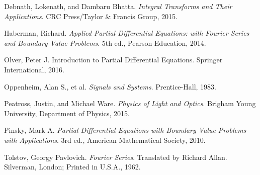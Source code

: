 \documentclass[12pt,letterpaper]{article}
\begin{document}

\begin{thebibliography}{9}

Debnath, Lokenath, and Dambaru Bhatta. \textit{Integral Transforms and Their Applications}. CRC Press/Taylor \& Francis Group, 2015.

Haberman, Richard. \textit{Applied Partial Differential Equations: with Fourier Series and Boundary Value Problems}. 5th ed., Pearson Education, 2014.

Olver, Peter J. Introduction to Partial Differential Equations. Springer International, 2016.

Oppenheim, Alan S., et al. \textit{Signals and Systems}. Prentice-Hall, 1983.

Peatross, Justin, and Michael Ware. \textit{Physics of Light and Optics}. Brigham Young University, Department of Physics, 2015.

Pinsky, Mark A. \textit{Partial Differential Equations with Boundary-Value Problems with Applications}. 3rd ed., American Mathematical Society, 2010.

Tolstov, Georgy Pavlovich. \textit{Fourier Series}. Translated by Richard Allan. Silverman, London; Printed in U.S.A., 1962.

\end{thebibliography}


\end{document}
